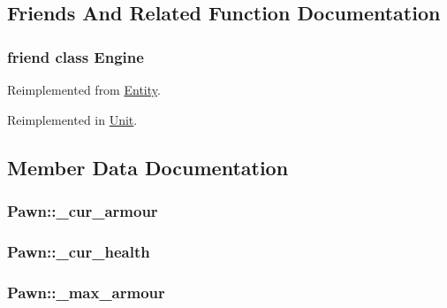 \subsection{Friends And Related Function Documentation}
\subsubsection[{Engine}]{\setlength{\rightskip}{0pt plus 5cm}friend class {\bf Engine}\hspace{0.3cm}{\ttfamily [friend]}}\label{class_pawn_a3e1914489e4bed4f9f23cdeab34a43dc}


Reimplemented from \hyperlink{class_entity_a3e1914489e4bed4f9f23cdeab34a43dc}{Entity}.



Reimplemented in \hyperlink{class_unit_a3e1914489e4bed4f9f23cdeab34a43dc}{Unit}.



\subsection{Member Data Documentation}
\subsubsection[{\-\_\-cur\-\_\-armour}]{ Pawn\-::\-\_\-cur\-\_\-armour\hspace{0.3cm}{\ttfamily [protected]}}\label{class_pawn_a577fc2cfe23224c96949c4bb3867e8e9}
\subsubsection[{\-\_\-cur\-\_\-health}]{ Pawn\-::\-\_\-cur\-\_\-health\hspace{0.3cm}{\ttfamily [protected]}}\label{class_pawn_afdc8ca44139d27704a2b728cde4a944e}
\subsubsection[{\-\_\-max\-\_\-armour}]{ Pawn\-::\-\_\-max\-\_\-armour\hspace{0.3cm}{\ttfamily [protected]}}\label{class_pawn_a45c9336f40515d51ac568db250e198d9}
